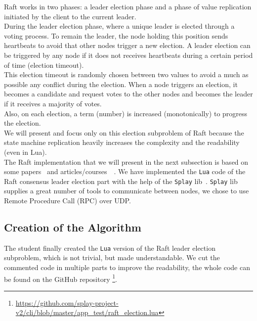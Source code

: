\documentclass{eplmastersthesis}
\begin{document}
        Raft works in two phases: a leader election phase and a phase of
        value replication initiated by the client to the current leader.\\
        During the leader election phase, where a unique leader is elected
        through a voting process. To remain the leader, the node holding
        this position sends heartbeats to avoid that other nodes trigger a
        new election. A leader election can be triggered by any node if it
        does not receives heartbeats during a certain period of time (election
        timeout).\\
        This election timeout is randomly chosen between two values
        to avoid a much as possible any conflict during the election. When a node
        triggers an election, it becomes a candidate and request votes to
        the other nodes and becomes the leader if it receives a majority of votes.\\
        Also, on each election, a term (number)
        is increased (monotonically) to progress the election.\\
        We will present and focus only on this election subproblem of
        Raft because the state machine replication heavily increases the complexity and
        the readability (even in Lua).\\

        The Raft implementation that we will present in the next subsection is based on
        some papers~\cite{RaftPaper} and articles/courses~\cite{RaftSlide}~\cite{RaftSite}.
        We have implemented the \texttt{Lua} code of the Raft consensus leader
        election part with the help of the \texttt{Splay} lib~\cite{SplayLib}.
        \texttt{Splay} lib supplies a great number of tools to communicate
        between nodes, we chose to use Remote Procedure Call (RPC) over UDP.\\

      \subsection{Creation of the Algorithm}

        The student finally created the \texttt{Lua} version of the Raft leader
        election subproblem, which is not trivial, but made
        understandable. We cut the commented code in multiple parts to improve the readability,
        the whole code can be found on the GitHub repository
        \footnote{\url{https://github.com/splay-project-v2/cli/blob/master/app_test/raft_election.lua}}.
\end{document}
